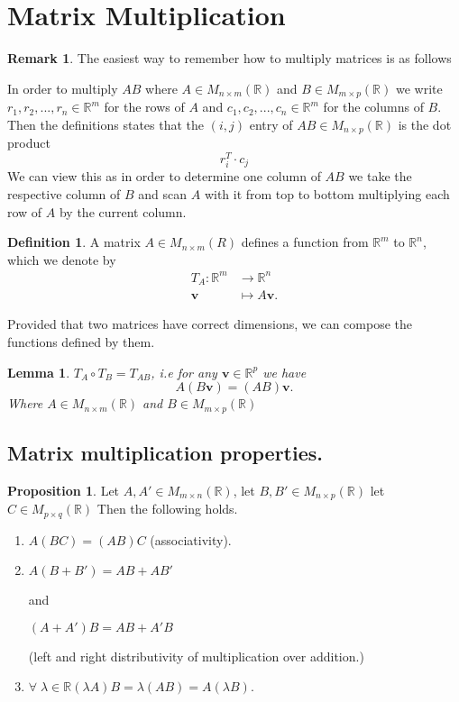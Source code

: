 \documentclass[11pt,a4paper]{article}
\newcommand\R{\mathbb{R}}
\newtheorem{lemma}{Lemma}
\theoremstyle{definition}
\newtheorem{definition}{Definition}
\newtheorem{proposition}{Proposition}
\newtheorem{remark}{Remark}
\begin{document}
\section{Matrix Multiplication}
\begin{remark}
   The easiest way to remember how to multiply matrices is as follows 
   
   In order to multiply $AB$ where $A \in M_{n \times m} (\R) $ and $B \in M_{m \times p} (\R) $ we write
   $ r_1, r_2, ..., r_n \in \R^m $ for the rows of $A$ and $ c_1, c_2, ..., c_n \in \R^m $ for the columns of $B$. 
   Then the definitions states that the $(i, j)$ entry of $AB \in M_{n \times p} (\R) $ is the dot product
   \[ r_i^T \cdot c_j\]
   We can view this as in order to determine one column of $AB$ we take the respective column of $B$ and scan $A$ with it from top to bottom multiplying each row of $A$ 
   by the current column.
\end{remark}

\begin{definition}
    A matrix $ A \in M_{n \times m} (R) $ defines a function from $\R^m $ to $ \R^n $, which we denote by
    \[\begin{split}
        T_A : \R^m &\to \R^n \\
        \mathbf{v} &\mapsto A\mathbf{v}.
    \end{split}
    \]
\end{definition}
Provided that two matrices have correct dimensions, we can compose the functions defined by them.
\begin{lemma}
    $T_A \circ T_B = T_{AB} $, i.e for any $\mathbf{v} \in \R^p $ we have
    \[ A(B\mathbf{v}) = (AB) \mathbf{v}.\]
    Where $A \in M_{n \times m} (\R) $ and $B \in M_{m \times p} (\R) $ 
\end{lemma}

\subsection{Matrix multiplication properties.}
\begin{proposition}
    Let $ A, A' \in M_{m \times n} (\R) $, let $ B, B' \in M_{n \times p} (\R) $ let $C \in M_{p \times q} (\R)$ Then the following holds. 
    \begin{enumerate}
        \item $A(BC) = (AB)C $ (associativity).
        \item $A(B + B') = AB + AB' $
        
        and

        $(A + A')B = AB + A'B $ 

        (left and right distributivity of multiplication over addition.)
        \item $ \forall \; \lambda \in \R (\lambda A)B = \lambda(AB) = A(\lambda B) $.
    \end{enumerate}
\end{proposition}
\end{document}
